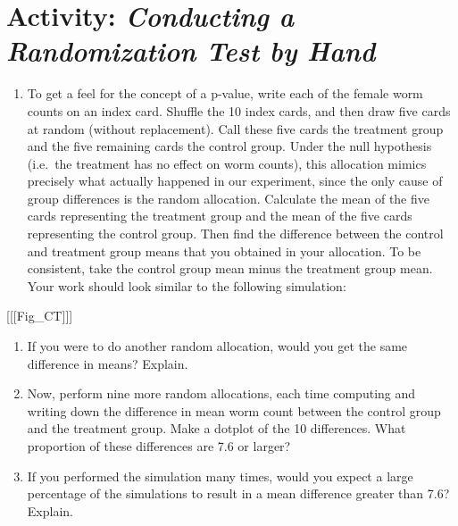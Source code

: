 \documentclass[
]{report}
\providecommand{\tightlist}{%
  \setlength{\itemsep}{0pt}\setlength{\parskip}{0pt}}
\begin{document}
\normalsize

\section*{\texorpdfstring{Activity: \emph{Conducting a Randomization Test by Hand}}{Activity: Conducting a Randomization Test by Hand}}\label{activity-conducting-a-randomization-test-by-hand}

\begin{enumerate}
\def\labelenumi{\arabic{enumi}.}
\setcounter{enumi}{2}
\tightlist
\item
  To get a feel for the concept of a p-value, write each of the female worm counts on an index card.
  Shuffle the 10 index cards, and then draw five cards at random (without replacement). Call these five
  cards the treatment group and the five remaining cards the control group. Under the null hypothesis
  (i.e.~the treatment has no effect on worm counts), this allocation mimics precisely what actually happened
  in our experiment, since the only cause of group differences is the random allocation.
  \textbar{} Calculate the mean of the five cards representing the treatment group and the mean of the five
  cards representing the control group. Then find the difference between the control and treatment group means that you obtained in your allocation. To be consistent, take the control group mean minus the
  treatment group mean. Your work should look similar to the following simulation:
\end{enumerate}

{[}{[}{[}Fig\_CT{]}{]}{]}

\begin{enumerate}
\def\labelenumi{\arabic{enumi}.}
\setcounter{enumi}{3}
\item
  If you were to do another random allocation, would you get the same difference in means? Explain.
\item
  Now, perform nine more random allocations, each time computing and writing down the difference in
  mean worm count between the control group and the treatment group. Make a dotplot of the 10 differences.
  What proportion of these differences are 7.6 or larger?
\item
  If you performed the simulation many times, would you expect a large percentage of the simulations to
  result in a mean difference greater than 7.6? Explain.
\end{enumerate}
\end{document}
